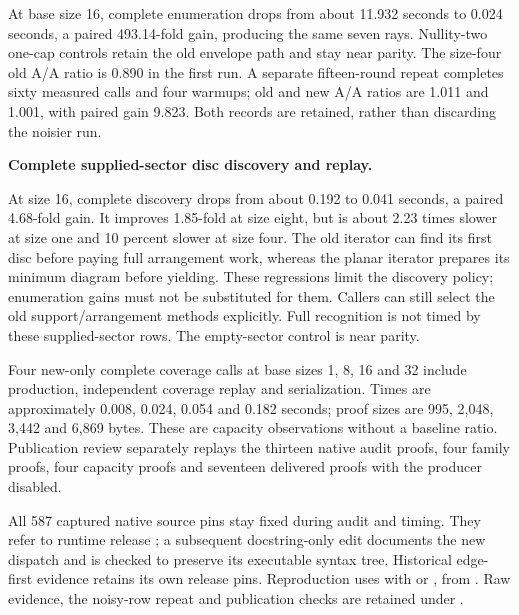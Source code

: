 At base size 16, complete enumeration drops from about 11.932 seconds to
0.024 seconds, a paired 493.14-fold gain, producing the same seven rays.
Nullity-two one-cap controls retain the old envelope path and stay near
parity. The size-four old A/A ratio is 0.890 in the first run. A separate
fifteen-round repeat completes sixty measured calls and four warmups;
old and new A/A ratios are 1.011 and 1.001, with paired gain 9.823.
Both records are retained, rather than discarding the noisier run.

\begin{samepage}
\noindent\textbf{Complete supplied-sector disc discovery and replay.}

\end{samepage}

At size 16, complete discovery drops from about 0.192 to 0.041 seconds,
a paired 4.68-fold gain. It improves 1.85-fold at size eight, but is
about 2.23 times slower at size one and 10 percent slower at size four.
The old iterator can find its first disc before paying full arrangement
work, whereas the planar iterator prepares its minimum diagram before
yielding. These regressions limit the discovery policy; enumeration gains
must not be substituted for them. Callers can still select the old
support/arrangement methods explicitly. Full recognition is not timed by
these supplied-sector rows. The empty-sector control is near parity.

Four new-only complete coverage calls at base sizes 1, 8, 16 and 32
include production, independent coverage replay and serialization. Times
are approximately 0.008, 0.024, 0.054 and 0.182 seconds; proof sizes are
995, 2,048, 3,442 and 6,869 bytes. These are capacity observations without
a baseline ratio. Publication review separately replays the thirteen
native audit proofs, four family proofs, four capacity proofs and seventeen
delivered proofs with the producer disabled.

All 587 captured native source pins stay fixed during audit and timing.
They refer to runtime release ; a subsequent docstring-only
edit documents the new dispatch and is checked to preserve its executable
syntax tree. Historical edge-first evidence retains its own release pins.
Reproduction uses  with
 or , from .
Raw evidence, the noisy-row repeat and publication checks are retained
under .
